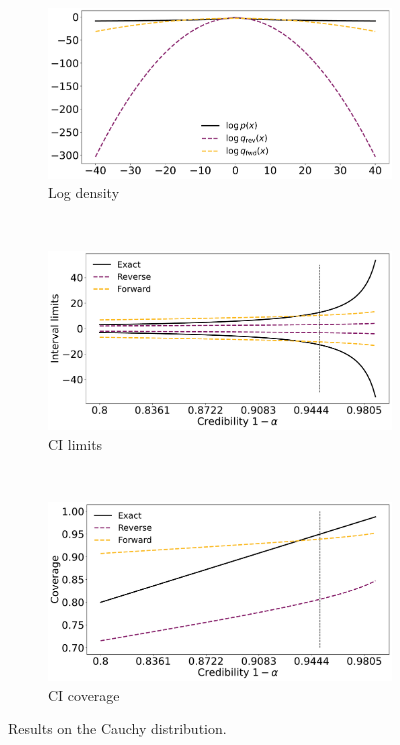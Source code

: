 \begin{figure}[ht]
    \begin{subfigure}{\linewidth}
    \centering
    \includegraphics[width=0.8\linewidth]{fig/cauchy_logq.pdf}
    \caption{Log density}
    \label{fig:cauchy_lp}
    \end{subfigure}\\[1ex]
    \begin{subfigure}{\linewidth}
    \centering
    \includegraphics[width=0.8\linewidth]{fig/cauchy_cilims.pdf}
    \caption{CI limits}
    \label{fig:cauchy_lims}
    \end{subfigure}\\[1ex]
    \begin{subfigure}{\linewidth}
    \centering
    \includegraphics[width=0.8\linewidth]{fig/cauchy_cicoverage.pdf}
    \caption{CI coverage}
    \label{fig:cauchy_coverage}
    \end{subfigure}
    \caption{Results on the Cauchy distribution.}
    \label{fig:cauchy}
\end{figure}



